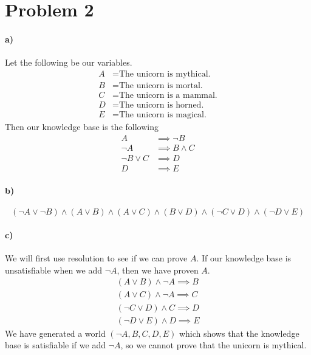 \documentclass[12pt]{article}
\begin{document}
\section*{Problem 2}

\paragraph{a)}

Let the following be our variables.
\begin{align*}
        A &= \text{The unicorn is mythical.}\\
        B &= \text{The unicorn is mortal.}\\
        C &= \text{The unicorn is a mammal.}\\
        D &= \text{The unicorn is horned.}\\
        E &= \text{The unicorn is magical.}
\end{align*}
Then our knowledge base is the following
\begin{align*}
        A&\implies \neg B\\
        \neg A &\implies B \land C\\
        \neg B \lor C &\implies D\\
        D &\implies E
\end{align*}

\paragraph{b)}

\[(\neg A \lor \neg B)\land(A \lor B)\land(A \lor C)\land(B \lor D)\land(\neg C \lor D)\land(\neg D \lor E)\]

\paragraph{c)}

We will first use resolution to see if we can prove \(A\). If our knowledge base is unsatisfiable when we add \(\neg A\), then we have proven \(A\).
\begin{gather*}
        (A \lor B)\land\neg A\implies B\\
        (A \lor C)\land\neg A\implies C\\
        (\neg C \lor D)\land C\implies D\\
        (\neg D \lor E)\land D\implies E
\end{gather*}
We have generated a world \((\neg A, B, C, D, E)\) which shows that the knowledge base is satisfiable if we add \(\neg A\),
so we cannot prove that the unicorn is mythical.
\end{document}
